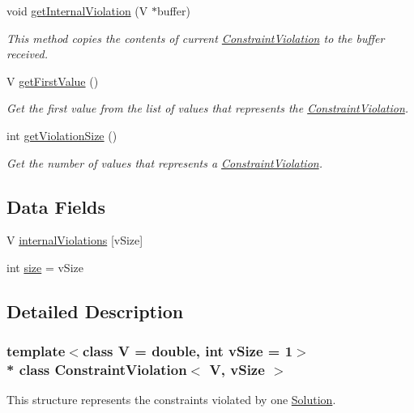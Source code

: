 \begin{DoxyCompactItemize}
void \hyperlink{structConstraintViolation_a78e2b3eb94fc78b767c689e7376228a9}{get\+Internal\+Violation} (V $\ast$buffer)
\begin{DoxyCompactList}\small\item\em This method copies the contents of current \hyperlink{structConstraintViolation}{Constraint\+Violation} to the buffer received. \end{DoxyCompactList}\item 
V \hyperlink{structConstraintViolation_a2d26f6240dd7f4b29f63bd47110fce6b}{get\+First\+Value} ()
\begin{DoxyCompactList}\small\item\em Get the first value from the list of values that represents the \hyperlink{structConstraintViolation}{Constraint\+Violation}. \end{DoxyCompactList}\item 
int \hyperlink{structConstraintViolation_a08e4988745e7389af2f276ead22600ee}{get\+Violation\+Size} ()
\begin{DoxyCompactList}\small\item\em Get the number of values that represents a \hyperlink{structConstraintViolation}{Constraint\+Violation}. \end{DoxyCompactList}\end{DoxyCompactItemize}
\subsection*{Data Fields}
\begin{DoxyCompactItemize}
\item 
V \hyperlink{structConstraintViolation_ac761fb762b35acd21469b3c088be7774}{internal\+Violations} \mbox{[}v\+Size\mbox{]}
\item 
int \hyperlink{structConstraintViolation_a2b1b8e70ce695b7d99cc2b31eb6a0cd9}{size} = v\+Size
\end{DoxyCompactItemize}


\subsection{Detailed Description}
\subsubsection*{template$<$class V = double, int v\+Size = 1$>$\\*
class Constraint\+Violation$<$ V, v\+Size $>$}

This structure represents the constraints violated by one \hyperlink{classSolution}{Solution}. 


